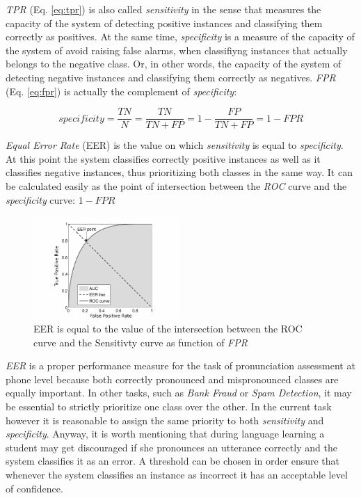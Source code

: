 \textit{TPR} (Eq. \ref{eq:tpr}) is also called \textit{sensitivity} in the sense that measures
the capacity of the system of detecting positive instances and classifying them
correctly as positives.
At the same time, \textit{specificity} is a measure of the capacity of the system of
avoid raising false alarms, when classifiyng instances that actually belongs to the
negative class. Or, in other words, the capacity of the system of detecting negative
instances and classifying them correctly as negatives. \textit{FPR} (Eq. \ref{eq:fpr})
is actually the complement of \textit{specificity}:

\begin{equation}
specificity = \frac{TN}{N} = \frac{TN}{TN+FP} = 1 - \frac{FP}{TN+FP} = 1 - FPR
\end{equation}

\textit{Equal Error Rate} (EER) is the value on which \textit{sensitivity} is equal to
\textit{specificity}. At this point the system classifies correctly positive instances
as well as it classifies negative instances, thus prioritizing both classes in the same
way. It can be calculated easily as the point of intersection between the \textit{ROC}
curve and the \textit{specificity} curve: $1-FPR$

\begin{figure}[H]
  \centering
  \includegraphics[width=0.5\textwidth]{files/figures/method/eer}
  \caption{EER is equal to the value of the intersection between the ROC curve and
  the Sensitivty curve as function of \textit{FPR}}
  \label{fig:eer}
\end{figure}

\textit{EER} is a proper performance measure for the task of pronunciation assessment
at phone level because both correctly pronounced and mispronounced
classes are equally important. In other tasks, such as \textit{Bank Fraud} or
\textit{Spam Detection}, it may be essential to strictly prioritize one class over the
other. In the current task however it is reasonable to assign the same priority
to both \textit{sensitivity} and \textit{specificity}.
Anyway, it is worth mentioning that during language learning a student may get
discouraged if she pronounces an utterance correctly and the system classifies it as
an error. A threshold can be chosen in order ensure that whenever the system
classifies an instance as incorrect it has an acceptable level of confidence.

